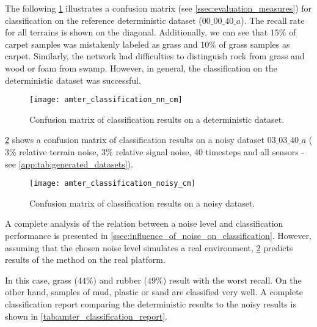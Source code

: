 The following \cref{fig:amter_cm_nn} illustrates a confusion matrix (see \cref{ssec:evaluation_measures}) for classification on the reference deterministic dataset ($ 00\_00\_40\_a $). The recall rate for all terrains is shown on the diagonal. Additionally, we can see that $ 15\% $ of carpet samples was mistakenly labeled as grass and $ 10\% $ of grass samples as carpet. Similarly, the network had difficulties to distinguish rock from grass and wood or foam from swamp. However, in general, the classification on the deterministic dataset was successful.

\begin{figure}[H]
  \centering
  \texttt{[image: amter\_classification\_nn\_cm]}
  \caption{Confusion matrix of classification results on a deterministic dataset.}
  \label{fig:amter_cm_nn}
\end{figure}

\cref{fig:amter_cm_noisy} shows a confusion matrix of classification results on a noisy dataset $ 03\_03\_40\_a $ ($ 3\% $ relative terrain noise, $ 3\% $ relative signal noise, 40 timesteps and all sensors - see \cref{app:tab:generated_datasets}).

\begin{figure}[H]
  \centering
  \texttt{[image: amter\_classification\_noisy\_cm]}
  \caption{Confusion matrix of classification results on a noisy dataset.}
  \label{fig:amter_cm_noisy}
\end{figure}

A complete analysis of the relation between a noise level and classification performance is presented in \cref{ssec:influence_of_noise_on_classification}. However, assuming that the chosen noise level simulates a real environment, \cref{fig:amter_cm_noisy} predicts results of the method on the real platform.

In this case, grass ($ 44\% $) and rubber ($ 49\% $) result with the worst recall. On the other hand, samples of mud, plastic or sand are classified very well. A complete classification report comparing the deterministic results to the noisy results is shown in \cref{tab:amter_classification_report}.

